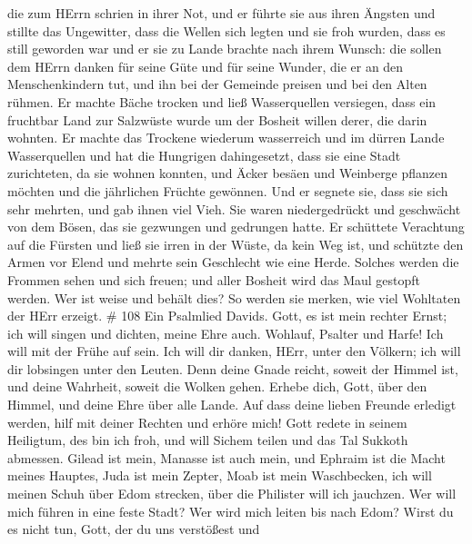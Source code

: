  die zum HErrn schrien in ihrer Not, und er führte sie aus
ihren Ängsten  und stillte das Ungewitter, dass die Wellen
sich legten  und sie froh wurden, dass es still geworden
war und er sie zu Lande brachte nach ihrem Wunsch:  die
sollen dem HErrn danken für seine Güte und für seine Wunder, die er an
den Menschenkindern tut,  und ihn bei der Gemeinde preisen
und bei den Alten rühmen.  Er machte Bäche trocken und ließ
Wasserquellen versiegen,  dass ein fruchtbar Land zur
Salzwüste wurde um der Bosheit willen derer, die darin wohnten.
 Er machte das Trockene wiederum wasserreich und im dürren
Lande Wasserquellen  und hat die Hungrigen dahingesetzt,
dass sie eine Stadt zurichteten, da sie wohnen konnten, 
und Äcker besäen und Weinberge pflanzen möchten und die jährlichen
Früchte gewönnen.  Und er segnete sie, dass sie sich sehr
mehrten, und gab ihnen viel Vieh.  Sie waren niedergedrückt
und geschwächt von dem Bösen, das sie gezwungen und gedrungen hatte.
 Er schüttete Verachtung auf die Fürsten und ließ sie irren
in der Wüste, da kein Weg ist,  und schützte den Armen vor
Elend und mehrte sein Geschlecht wie eine Herde.  Solches
werden die Frommen sehen und sich freuen; und aller Bosheit wird das
Maul gestopft werden.  Wer ist weise und behält dies? So
werden sie merken, wie viel Wohltaten der HErr erzeigt. \# 108
 Ein Psalmlied Davids.  Gott, es ist mein
rechter Ernst; ich will singen und dichten, meine Ehre auch.
 Wohlauf, Psalter und Harfe! Ich will mit der Frühe auf
sein.  Ich will dir danken, HErr, unter den Völkern; ich
will dir lobsingen unter den Leuten.  Denn deine Gnade
reicht, soweit der Himmel ist, und deine Wahrheit, soweit die Wolken
gehen.  Erhebe dich, Gott, über den Himmel, und deine Ehre
über alle Lande.  Auf dass deine lieben Freunde erledigt
werden, hilf mit deiner Rechten und erhöre mich!  Gott
redete in seinem Heiligtum, des bin ich froh, und will Sichem teilen und
das Tal Sukkoth abmessen.  Gilead ist mein, Manasse ist auch
mein, und Ephraim ist die Macht meines Hauptes, Juda ist mein Zepter,
 Moab ist mein Waschbecken, ich will meinen Schuh über Edom
strecken, über die Philister will ich jauchzen.  Wer will
mich führen in eine feste Stadt? Wer wird mich leiten bis nach Edom?
 Wirst du es nicht tun, Gott, der du uns verstößest und
